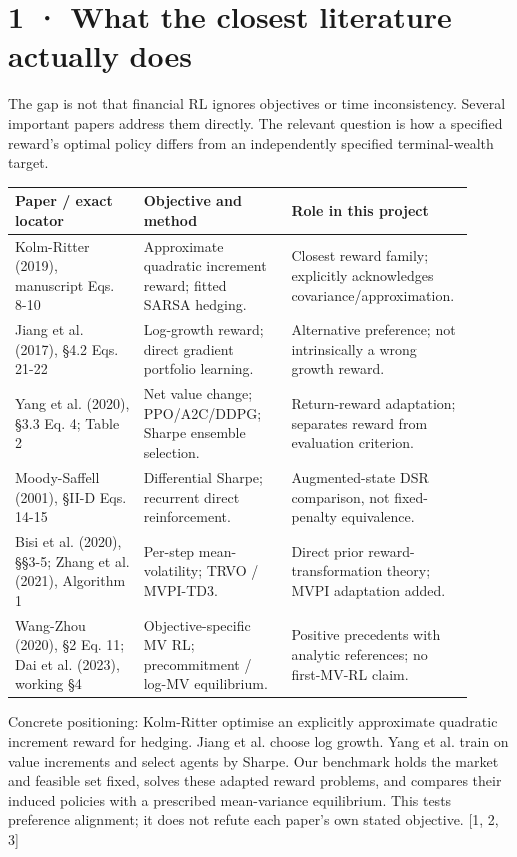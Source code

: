 \documentclass[10pt,a4paper]{article}
\begin{document}
\clearpage
\section*{1 · What the closest literature actually does}
The gap is not that financial RL ignores objectives or time inconsistency. Several important papers address them directly. The relevant question is how a specified reward’s optimal policy differs from an independently specified terminal-wealth target.

\begin{longtable}{p{0.273\linewidth}p{0.319\linewidth}p{0.319\linewidth}}
\hline
\textbf{Paper / exact locator} & \textbf{Objective and method} & \textbf{Role in this project}\\\hline
Kolm-Ritter (2019), manuscript Eqs. 8-10 & Approximate quadratic increment reward; fitted SARSA hedging. & Closest reward family; explicitly acknowledges covariance/approximation.\\\hline
Jiang et al. (2017), §4.2 Eqs. 21-22 & Log-growth reward; direct gradient portfolio learning. & Alternative preference; not intrinsically a wrong growth reward.\\\hline
Yang et al. (2020), §3.3 Eq. 4; Table 2 & Net value change; PPO/A2C/DDPG; Sharpe ensemble selection. & Return-reward adaptation; separates reward from evaluation criterion.\\\hline
Moody-Saffell (2001), §II-D Eqs. 14-15 & Differential Sharpe; recurrent direct reinforcement. & Augmented-state DSR comparison, not fixed-penalty equivalence.\\\hline
Bisi et al. (2020), §§3-5; Zhang et al. (2021), Algorithm 1 & Per-step mean-volatility; TRVO / MVPI-TD3. & Direct prior reward-transformation theory; MVPI adaptation added.\\\hline
Wang-Zhou (2020), §2 Eq. 11; Dai et al. (2023), working §4 & Objective-specific MV RL; precommitment / log-MV equilibrium. & Positive precedents with analytic references; no first-MV-RL claim.\\\hline
\end{longtable}
Concrete positioning: Kolm-Ritter optimise an explicitly approximate quadratic increment reward for hedging. Jiang et al. choose log growth. Yang et al. train on value increments and select agents by Sharpe. Our benchmark holds the market and feasible set fixed, solves these adapted reward problems, and compares their induced policies with a prescribed mean-variance equilibrium. This tests preference alignment; it does not refute each paper’s own stated objective. [1, 2, 3]
\end{document}
